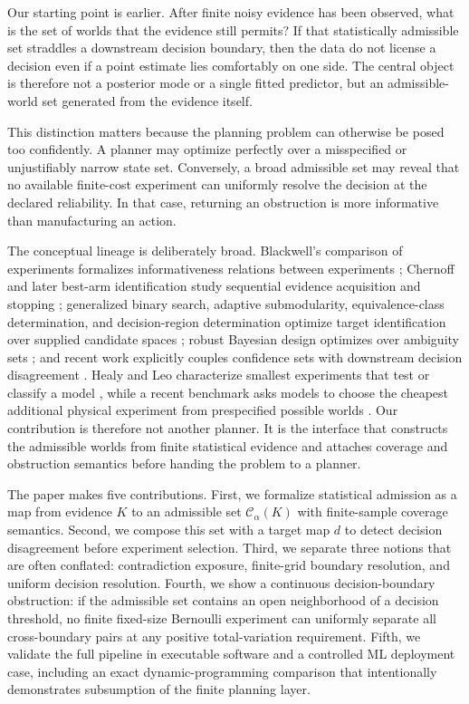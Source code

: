 \documentclass[11pt]{article}
\newcommand{\CalC}{\mathcal{C}}
\begin{document}
Our starting point is earlier. After finite noisy evidence has been observed, what is the set of worlds that the evidence still permits? If that statistically admissible set straddles a downstream decision boundary, then the data do not license a decision even if a point estimate lies comfortably on one side. The central object is therefore not a posterior mode or a single fitted predictor, but an admissible-world set generated from the evidence itself.

This distinction matters because the planning problem can otherwise be posed too confidently. A planner may optimize perfectly over a misspecified or unjustifiably narrow state set. Conversely, a broad admissible set may reveal that no available finite-cost experiment can uniformly resolve the decision at the declared reliability. In that case, returning an obstruction is more informative than manufacturing an action.

The conceptual lineage is deliberately broad. Blackwell's comparison of experiments formalizes informativeness relations between experiments \parencite{blackwell1951,blackwell1953}; Chernoff and later best-arm identification study sequential evidence acquisition and stopping \parencite{chernoff1959,garivier2016,kaufmann2016}; generalized binary search, adaptive submodularity, equivalence-class determination, and decision-region determination optimize target identification over supplied candidate spaces \parencite{nowak2011,golovin2010,golovin2011,javdani2014}; robust Bayesian design optimizes over ambiguity sets \parencite{go2022}; and recent work explicitly couples confidence sets with downstream decision disagreement \parencite{wan2026}. Healy and Leo characterize smallest experiments that test or classify a model \parencite{healy2026}, while a recent benchmark asks models to choose the cheapest additional physical experiment from prespecified possible worlds \parencite{saha2026}. Our contribution is therefore not another planner. It is the interface that constructs the admissible worlds from finite statistical evidence and attaches coverage and obstruction semantics before handing the problem to a planner.

The paper makes five contributions. First, we formalize statistical admission as a map from evidence $K$ to an admissible set $\CalC_\alpha(K)$ with finite-sample coverage semantics. Second, we compose this set with a target map $d$ to detect decision disagreement before experiment selection. Third, we separate three notions that are often conflated: contradiction exposure, finite-grid boundary resolution, and uniform decision resolution. Fourth, we show a continuous decision-boundary obstruction: if the admissible set contains an open neighborhood of a decision threshold, no finite fixed-size Bernoulli experiment can uniformly separate all cross-boundary pairs at any positive total-variation requirement. Fifth, we validate the full pipeline in executable software and a controlled ML deployment case, including an exact dynamic-programming comparison that intentionally demonstrates subsumption of the finite planning layer.
\end{document}
